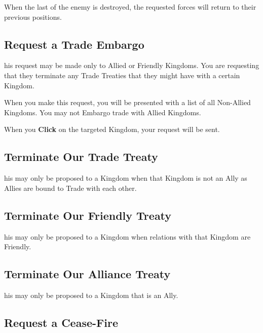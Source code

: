When the last of the enemy is destroyed, the requested forces will return to their previous positions.

\subsection{Request a Trade Embargo}


his request may be made only to Allied or Friendly Kingdoms. You are requesting that they terminate any Trade Treaties that they might have with a certain Kingdom.

When you make this request, you will be presented with a list of all Non-Allied Kingdoms. You may not Embargo trade with Allied Kingdoms.

When you \textbf{Click} on the targeted Kingdom, your request will be sent.

\subsection{Terminate Our Trade Treaty}


his may only be proposed to a Kingdom when that Kingdom is not an Ally as Allies are bound to Trade with each other.

\subsection{Terminate Our Friendly Treaty}


his may only be proposed to a Kingdom when relations with that Kingdom are Friendly.

\subsection{Terminate Our Alliance Treaty}


his may only be proposed to a Kingdom that is an Ally.

\subsection{Request a Cease-Fire}


